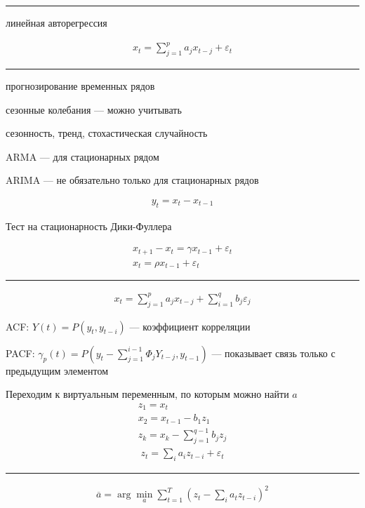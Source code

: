 \documentclass{book}
\begin{document}
\hrule

линейная авторегрессия

\begin{gather*}
  x_t=\sum_{j=1}^{p} {a_jx_{t-j}}+\varepsilon_t
\end{gather*}

\hrule

прогнозирование временных рядов

сезонные колебания --- можно учитывать

сезонность, тренд, стохастическая случайность

ARMA --- для стационарных рядом

ARIMA --- не обязательно только для стационарных рядов

\begin{gather*}
  y_t=x_t-x_{t-1}
\end{gather*}


Тест на стационарность Дики-Фуллера

\begin{gather*}
  x_{t+1}-x_t=\gamma x_{t-1}+\varepsilon_t\\
  x_t=\rho x_{t-1}+\varepsilon_t
\end{gather*}

\hrule

\begin{gather*}
  x_t=\sum_{j=1}^{p} {a_jx_{t-j}}+\sum_{i=1}^{q} {b_j\varepsilon_j}
\end{gather*}

ACF: $Y(t)=P(y_t, y_{t-i})$ --- коэффициент корреляции

PACF: $\gamma_p(t)=P(y_t-\sum_{j=1}^{i-1} {\Phi_jY_{t-j}},y_{t-1})$ --- показывает связь только с предыдущим элементом


Переходим к виртуальным переменным, по которым можно найти $a$
\begin{gather*}
  z_1=x_t\\
  x_2=x_{t-1}-b_1z_1\\
  z_k=x_k-\sum_{j=1}^{q-1} {b_jz_j}
\end{gather*}
\begin{gather*}
  z_t=\sum_{i}^{} {a_i z_{t-i}}+\varepsilon_t
\end{gather*}

\hrule

\begin{gather*}
  \overline{a}=\arg\min_a \sum_{t=1}^{T} {\left(z_t-\sum_{i}^{} {a_t z_{t-i}}\right)^2}
\end{gather*}
\end{document}
